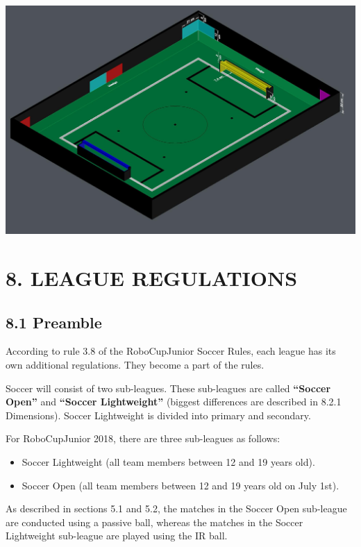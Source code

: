 \documentclass{article}
\begin{document}
\includegraphics[width=1\textwidth]{media/image7.jpeg}

\section{8. LEAGUE REGULATIONS \label{ref-052}}

\subsection{8.1 Preamble \label{ref-053}}

According to rule \textcolor{color-5}{3.8} of the RoboCupJunior Soccer Rules, each league has its own additional regulations. They become a part of the rules.

Soccer will consist of two sub-leagues. These sub-leagues are called \textbf{``}\textbf{\textcolor{color-5}{Soccer Open}}\textbf{''} and \textbf{``}\textbf{\textcolor{color-5}{Soccer Lightweight}}\textbf{''} (\textcolor{color-5}{biggest differences are described in 8.2.1 Dimensions}). \textcolor{color-5}{Soccer Lightweight} \textcolor{color-5}{is} divided into primary and secondary.

For RoboCupJunior \textcolor{color-5}{2018}, there are three sub-leagues as follows: 

\begin{itemize}

\item \textcolor{color-5}{Soccer Lightweight} \textcolor{color-5}{(all team members between 12 and 19 years old}\textcolor{color-5}{).}

\item \textcolor{color-5}{Soccer Open} \textcolor{color-5}{(all team members between 12 and 19 years old on July 1st)}.

\end{itemize}
\textcolor{color-5}{As described in sections 5.1 and 5.2, the matches in the Soccer Open sub-league are conducted using a passive ball, whereas the matches in the Soccer Lightweight sub-league are played using the IR ball.}
\end{document}
